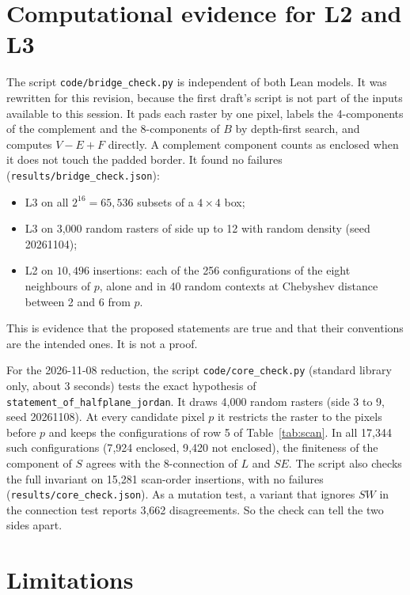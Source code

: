\documentclass[11pt]{article}
\theoremstyle{definition}
\theoremstyle{remark}
\begin{document}
\section{Computational evidence for L2 and L3}\label{sec:evidence}

The script \texttt{code/bridge\_check.py} is independent of both Lean models. It
was rewritten for this revision, because the first draft's script is not part of
the inputs available to this session. It pads each raster by one pixel, labels the 4-components of the complement and
the 8-components of $B$ by depth-first search, and computes $V-E+F$ directly. A complement component counts as enclosed when
it does not touch the padded border.
It found no failures (\texttt{results/bridge\_check.json}):
\begin{itemize}
\item L3 on all $2^{16}=65{,}536$ subsets of a $4\times4$ box;
\item L3 on 3{,}000 random rasters of side up to 12 with random density (seed 20261104);
\item L2 on $10{,}496$ insertions: each of the 256 configurations of the eight
  neighbours of $p$, alone and in 40 random contexts at Chebyshev distance
  between 2 and 6 from $p$.
\end{itemize}
This is evidence that the proposed statements are true and that their
conventions are the intended ones. It is not a proof.

For the 2026-11-08 reduction, the script \texttt{code/core\_check.py} (standard
library only, about 3 seconds) tests the exact hypothesis of
\texttt{statement\_of\_halfplane\_jordan}. It draws 4{,}000 random rasters (side 3
to 9, seed 20261108). At every candidate pixel $p$ it restricts the raster to the
pixels before $p$ and keeps the configurations of row 5 of
Table~\ref{tab:scan}. In all 17{,}344 such configurations (7{,}924 enclosed, 9{,}420
not enclosed), the finiteness of the component of $S$ agrees with the
8-connection of $L$ and $SE$. The script also checks the full invariant on 15{,}281
scan-order insertions, with no failures (\texttt{results/core\_check.json}). As a
mutation test, a variant that ignores $SW$ in the connection test reports 3{,}662
disagreements. So the check can tell the two sides apart.

\section{Limitations}
\end{document}
